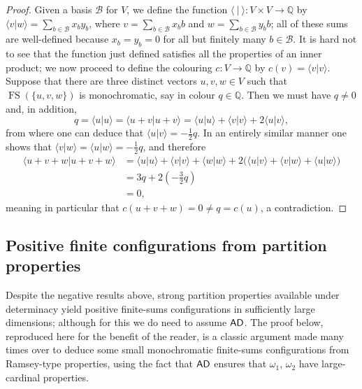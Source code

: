 \documentclass{amsart}
\theoremstyle{definition}
\newcommand{\ad}{\mathnormal{\mathsf{AD}}}
\theoremstyle{remark}
\numberwithin{equation}{section}
\begin{document}
    \begin{proof}%
        Given a basis $\mathcal{B}$ for $V$, we define the function $\langle\ |\ \rangle:V\times V\longrightarrow\mathbb Q$ by $\langle v|w\rangle=\sum_{b\in\mathcal B}x_b y_b$, where $v=\sum_{b\in\mathcal B}x_b b$ and $w=\sum_{b\in\mathcal B}y_b b$; all of these sums are well-defined because $x_b=y_b=0$ for all but finitely many $b\in\mathcal B$. It is hard not to see that the function just defined satisfies all the properties of an inner product; we now proceed to define the colouring $c:V\longrightarrow\mathbb{Q}$ by $c(v)=\langle v|v\rangle$. Suppose that there are three distinct vectors $u,v,w\in V$ such that $\operatorname{FS}(\{u,v,w\})$ is monochromatic, say in colour $q\in\mathbb Q$. Then we must have $q\neq 0$ and, in addition,
        \begin{equation*}
            q=\langle u|u\rangle=\langle u+v|u+v\rangle=\langle u|u\rangle+\langle v|v\rangle+2\langle u|v\rangle,
        \end{equation*}
        from where one can deduce that $\langle u|v\rangle=-\frac{1}{2}q$. In an entirely similar manner one shows that $\langle v|w\rangle=\langle u|w\rangle=-\frac{1}{2}q$, and therefore
        \begin{align*}
            \langle u+v+w|u+v+w\rangle
            &=\langle u|u\rangle+\langle v|v\rangle+\langle w|w\rangle+2\big(\langle u|v\rangle+\langle v|w\rangle+\langle u|w\rangle\big)\\
            &=3q+2\left(-\frac{3}{2}q\right)\\
            &=0,
        \end{align*}
        meaning in particular that $c(u+v+w)=0\neq q=c(u)$, a contradiction.
    \end{proof}


\subsection{Positive finite configurations from partition properties}\label{subsec:hindman-positives}

Despite the negative results above, strong partition properties available under determinacy yield positive finite-sums configurations in sufficiently large dimensions; although for this we do need to assume $\ad$. The proof below, reproduced here for the benefit of the reader, is a classic argument made many times over to deduce some small monochromatic finite-sums configurations from Ramsey-type properties, using the fact that $\ad$ ensures that $\omega_1$, $\omega_2$ have large-cardinal properties.
\end{document}

